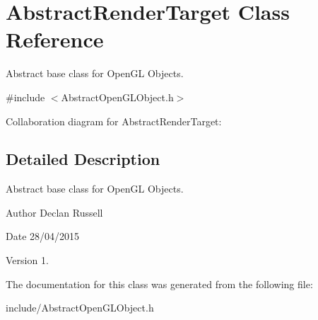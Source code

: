 \hypertarget{class_abstract_render_target}{\section{Abstract\-Render\-Target Class Reference}
\label{class_abstract_render_target}
}


Abstract base class for Open\-G\-L Objects.  




{\ttfamily \#include $<$Abstract\-Open\-G\-L\-Object.\-h$>$}



Collaboration diagram for Abstract\-Render\-Target\-:


\subsection{Detailed Description}
Abstract base class for Open\-G\-L Objects. 

\begin{DoxyAuthor}{Author}
Declan Russell 
\end{DoxyAuthor}
\begin{DoxyDate}{Date}
28/04/2015 
\end{DoxyDate}
\begin{DoxyVersion}{Version}
1. 
\end{DoxyVersion}


The documentation for this class was generated from the following file\-:\begin{DoxyCompactItemize}
\item 
include/Abstract\-Open\-G\-L\-Object.\-h\end{DoxyCompactItemize}
